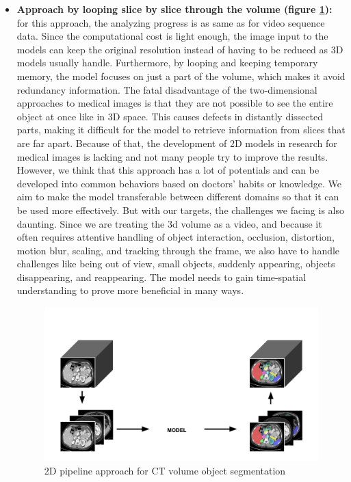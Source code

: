 \begin{itemize}
    \item \textbf{Approach by looping slice by slice through the volume (figure \ref{fig:vos_2d}):} for this approach, the analyzing progress is as same as for video sequence data. Since the computational cost is light enough, the image input to the models can keep the original resolution instead of having to be reduced as 3D models usually handle. Furthermore, by looping and keeping temporary memory, the model focuses on just a part of the volume, which makes it avoid redundancy information. The fatal disadvantage of the two-dimensional approaches to medical images is that they are not possible to see the entire object at once like in 3D space. This causes defects in distantly dissected parts, making it difficult for the model to retrieve information from slices that are far apart. Because of that, the development of 2D models in research for medical images is lacking and not many people try to improve the results. However, we think that this approach has a lot of potentials and can be developed into common behaviors based on doctors' habits or knowledge. We aim to make the model transferable between different domains so that it can be used more effectively. But with our targets, the challenges we facing is also daunting. Since we are treating the 3d volume as a video, and because it often requires attentive handling of object interaction, occlusion, distortion, motion blur, scaling, and tracking through the frame, we also have to handle challenges like being out of view, small objects, suddenly appearing, objects disappearing, and reappearing. The model needs to gain time-spatial understanding to prove more beneficial in many ways.
    
    \begin{figure}[!h]
        \centering
        \includegraphics[width=\textwidth]{content/resources/new_images/intro/2d_approach.pdf}
        \caption{2D pipeline approach for CT volume object segmentation}
        \label{fig:vos_2d}
    \end{figure}
    
\end{itemize}


